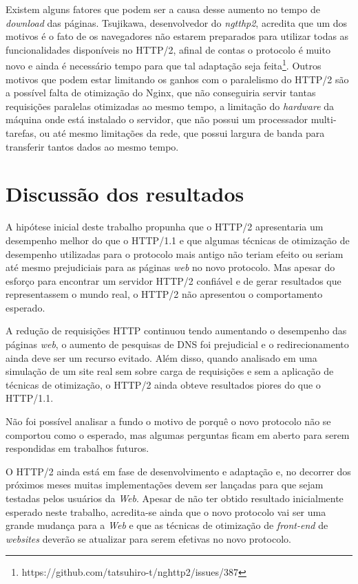 Existem alguns fatores que podem ser a causa desse aumento no tempo de \textit{download} das páginas. Tsujikawa, desenvolvedor do \textit{ngtthp2}, acredita que um dos motivos é o fato de os navegadores não estarem preparados para utilizar todas as funcionalidades disponíveis no HTTP/2, afinal de contas o protocolo é muito novo e ainda é necessário tempo para que tal adaptação seja feita\footnote{https://github.com/tatsuhiro-t/nghttp2/issues/387}. Outros motivos que podem estar limitando os ganhos com o paralelismo do HTTP/2 são a possível falta de otimização do Nginx, que não conseguiria servir tantas requisições paralelas otimizadas ao mesmo tempo, a limitação do \textit{hardware} da máquina onde está instalado o servidor, que não possui um processador multi-tarefas, ou até mesmo limitações da rede, que possui largura de banda para transferir tantos dados ao mesmo tempo.

\section{Discussão dos resultados}
\label{discussaodosresultados}

A hipótese inicial deste trabalho propunha que o HTTP/2 apresentaria um desempenho melhor do que o HTTP/1.1 e que algumas técnicas de otimização de desempenho utilizadas para o protocolo mais antigo não teriam efeito ou seriam até mesmo prejudiciais para as páginas \textit{web} no novo protocolo. Mas apesar do esforço para encontrar um servidor HTTP/2 confiável e de gerar resultados que representassem o mundo real, o HTTP/2 não apresentou o comportamento esperado.

A redução de requisições HTTP continuou tendo aumentando o desempenho das páginas \textit{web}, o aumento de pesquisas de DNS foi prejudicial e o redirecionamento ainda deve ser um recurso evitado. Além disso, quando analisado em uma simulação de um site real sem sobre carga de requisições e sem a aplicação de técnicas de otimização, o HTTP/2 ainda obteve resultados piores do que o HTTP/1.1.

Não foi possível analisar a fundo o motivo de porquê o novo protocolo não se comportou como o esperado, mas algumas perguntas ficam em aberto para serem respondidas em trabalhos futuros.

O HTTP/2 ainda está em fase de desenvolvimento e adaptação e, no decorrer dos próximos meses muitas implementações devem ser lançadas para que sejam testadas pelos usuários da \textit{Web}. Apesar de não ter obtido resultado inicialmente esperado neste trabalho, acredita-se ainda que o novo protocolo vai ser uma grande mudança para a \textit{Web} e que as técnicas de otimização de \textit{front-end} de \textit{websites} deverão se atualizar para serem efetivas no novo protocolo.

